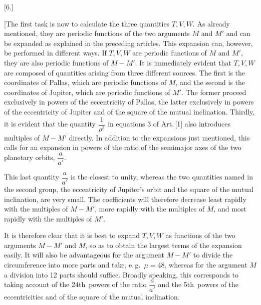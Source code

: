 \clearpage
\begin{landscape}
\begingroup
\fontsize{10}{13}\selectfont
{}
\renewcommand{\headrulewidth}{0pt}
\newcommand{\VSixPoint}{\mathord{.}\mkern5mu}
\newcommand{\VSixTenPoints}{\VSixPoint\VSixPoint\VSixPoint\VSixPoint\VSixPoint\VSixPoint\VSixPoint\VSixPoint\VSixPoint\VSixPoint}
\begin{center}[6.]\end{center}
\par\noindent\hspace*{\parindent}[The first task is now to calculate the three quantities \(T,V,W\). As already mentioned, they are periodic functions of the two arguments \(M\) and \(M'\) and can be expanded as explained in the preceding articles. This expansion can, however, be performed in different ways. If \(T,V,W\) are periodic functions of \(M\) and \(M'\), they are also periodic functions of \(M-M'\). It is immediately evident that \(T,V,W\) are composed of quantities arising from three different sources. The first is the coordinates of Pallas, which are periodic functions of \(M\), and the second is the coordinates of Jupiter, which are periodic functions of \(M'\). The former proceed exclusively in powers of the eccentricity of Pallas, the latter exclusively in powers of the eccentricity of Jupiter and of the square of the mutual inclination. Thirdly, it is evident that the quantity \(\dfrac{1}{\rho^3}\) in equations 3 of Art.\,[1] also introduces multiples of \(M-M'\) directly. In addition to the expansions just mentioned, this calls for an expansion in powers of the ratio of the semimajor axes of the two planetary orbits, \(\dfrac{a}{a'}\).
\par\noindent\hspace*{\parindent}This last quantity \(\dfrac{a}{a'}\) is the closest to unity, whereas the two quantities named in the second group, the eccentricity of Jupiter's orbit and the square of the mutual inclination, are very small. The coefficients will therefore decrease least rapidly with the multiples of \(M-M'\), more rapidly with the multiples of \(M\), and most rapidly with the multiples of \(M'\).
\par\noindent\hspace*{\parindent}It is therefore clear that it is best to expand \(T,V,W\) as functions of the two arguments \(M-M'\) and \(M\), so as to obtain the largest terms of the expansion easily. It will also be advantageous for the argument \(M-M'\) to divide the circumference into more parts and take, e.\,g.\ \(\mu=48\), whereas for the argument \(M\) a division into 12 parts should suffice. Broadly speaking, this corresponds to taking account of the 24th\ powers of the ratio \(\dfrac{a}{a'}\) and the 5th\ powers of the eccentricities and of the square of the mutual inclination.

\end{landscape}
